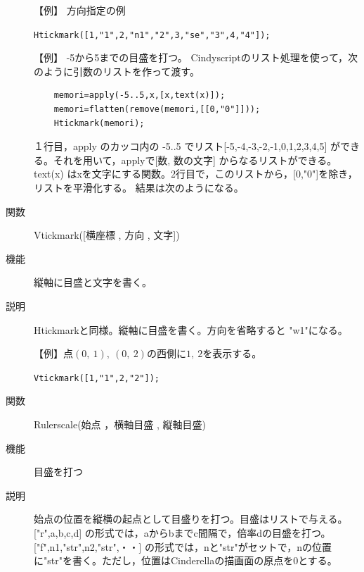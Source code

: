 \documentclass[papersize,a4paper,12pt,uplatex]{jsarticle}
\begin{document}
\begin{description}
\vspace{\baselineskip}
【例】 方向指定の例

\hspace{10mm} \verb|Htickmark([1,"1",2,"n1","2",3,"se","3",4,"4"]);|

\vspace{\baselineskip}
\begin{center}

\end{center}

【例】  -5から5までの目盛を打つ。
  Cindyscriptのリスト処理を使って，次のように引数のリストを作って渡す。
\begin{verbatim}
    memori=apply(-5..5,x,[x,text(x)]);
    memori=flatten(remove(memori,[[0,"0"]]));
    Htickmark(memori);
\end{verbatim}
１行目，apply のカッコ内の -5..5 でリスト[-5,-4,-3,-2,-1,0,1,2,3,4,5] ができる。それを用いて，applyで[数, 数の文字] からなるリストができる。text(x) はxを文字にする関数。2行目で，このリストから，[0,"0"]を除き，リストを平滑化する。 結果は次のようになる。

\begin{center} \scalebox{0.9}{}\end{center}

\hypertarget{vtickmark}{}
\item[関数]  Vtickmark([横座標 , 方向 , 文字])
\item[機能]  縦軸に目盛と文字を書く。
\item[説明]  Htickmarkと同様。縦軸に目盛を書く。方向を省略すると "w1"になる。

\vspace{\baselineskip}
【例】点$(0,\ 1),\ (0,\ 2)$の西側に$1,\ 2$を表示する。

\hspace{10mm}  \verb|Vtickmark([1,"1",2,"2"]);|

\vspace{\baselineskip}
\hypertarget{rulerscale}{}
\item[関数]  Rulerscale(始点 ，横軸目盛 , 縦軸目盛)
\item[機能]  目盛を打つ
\item[説明]  始点の位置を縦横の起点として目盛りを打つ。目盛はリストで与える。
  ["r",a,b,c,d]  の形式では，aからbまでc間隔で，倍率dの目盛を打つ。
  ["f",n1,"str",n2,"str",・・] の形式では，nと"str"がセットで，nの位置に"str"を書く。ただし，位置はCinderellaの描画面の原点を0とする。
  

\end{description}
\end{document}
